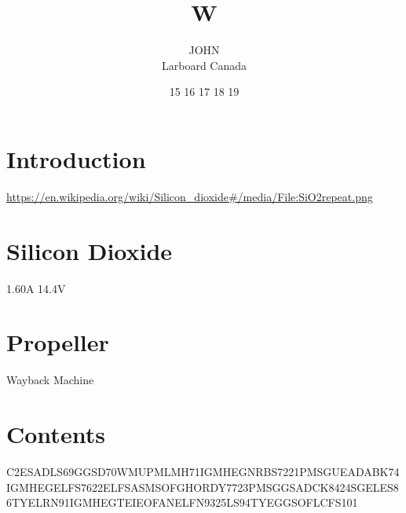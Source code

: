 \documentclass{article}
\title{W}
\author{
  \parbox{0.3\linewidth}{\centering JOHN\\Larboard Canada}
  }
\date{15 16 17 18 19}
\begin{document}
\maketitle

\section{Introduction}
\url{https://en.wikipedia.org/wiki/Silicon_dioxide#/media/File:SiO2repeat.png}

\section{Silicon Dioxide}
1.60A 14.4V

\section{Propeller}
Wayback Machine

\section{Contents}

C2ESADLS69GGSD70WMUPMLMH71IGMHEGNRBS7221PMSGUEADABK74IGMHEGELFS7622ELFSASMSOFGHORDY7723PMSGGSADCK8424SGELES86TYELRN91IGMHEGTEIEOFANELFN9325LS94TYEGGSOFLCFS101



\end{document}

